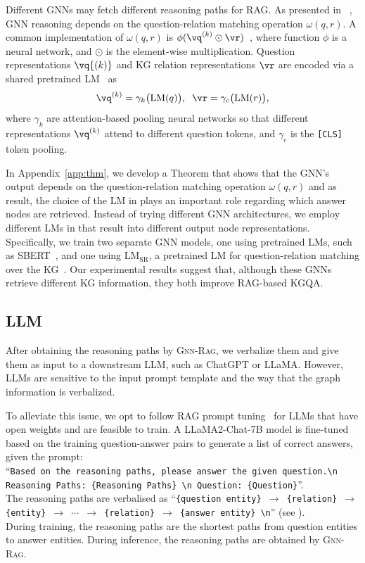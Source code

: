 \documentclass{article}
\newcommand{\grag}{\textsc{Gnn-Rag}\xspace}
\newcommand{\lmsr}{$\text{LM}_{\text{SR}}$\xspace}
\theoremstyle{plain}
\theoremstyle{definition}
\theoremstyle{remark}
\begin{document}
Different GNNs may fetch different reasoning paths for RAG. As presented in ~, GNN reasoning depends on the question-relation matching operation $\omega(q,r)$. A common implementation of $\omega(q,r)$ is  $\phi(\vq^{(k)} \odot \vr)$~\citep{he2021improving},  where function $\phi$ is a  neural network, and $\odot$ is the element-wise multiplication.  Question representations $\vq{(k)}$ and KG relation representations $\vr$ are encoded via a shared pretrained LM~\citep{jiang2023unikgqa} as
\begin{equation}
    \vq^{(k)} = \gamma_k\big( \text{LM}(q)\big),  \; \; \vr = \gamma_c \big( \text{LM}(r) \big),
    \label{eq:inst}
\end{equation}
where $\gamma_k$ are attention-based pooling neural networks so that different representations $\vq^{(k)}$ attend to different question tokens, and $\gamma_\text{c}$ is the \texttt{[CLS]} token pooling. 

In Appendix~\ref{app:thm}, we develop a Theorem  that shows that the GNN's output depends on the question-relation matching operation $\omega(q,r)$ and as result, the choice of the LM in  plays an important role regarding which answer nodes are retrieved. 
Instead of trying different GNN architectures, we employ different LMs in  that result into different output node representations. Specifically, we train two separate GNN models, one using pretrained LMs, such as  SBERT~\citep{reimers2019sentence}, and one using \lmsr, a pretrained LM for question-relation matching over the KG~\citep{zhang2022subgraph}. Our experimental results suggest that, although these GNNs retrieve different KG information, they both improve RAG-based KGQA.

\subsection{LLM} \label{sec:llm}

After obtaining the reasoning paths by \grag, we verbalize them and give them as input to a downstream LLM, such as ChatGPT or LLaMA. However, LLMs are sensitive to the input prompt template and the way that the graph information is verbalized.  

To alleviate this issue, we opt to follow RAG prompt tuning~\citep{lin2023radit,zhang2024raft} for LLMs that have open weights and are feasible to train. A LLaMA2-Chat-7B model is fine-tuned based on the training question-answer pairs to generate a list of correct answers, given the prompt: \\
``\texttt{Based on the reasoning paths, please answer the given question.\textbackslash n Reasoning Paths: \{Reasoning Paths\} \textbackslash n Question: \{Question\}}''. \\
The reasoning paths are verbalised as  ``\texttt{\{question entity\} $\rightarrow$ \{relation\} $\rightarrow$ \{entity\} $\rightarrow$ $\cdots$ $\rightarrow$ \{relation\} $\rightarrow$ \{answer entity\} \textbackslash n}'' (see ). \\
During training, the reasoning paths are the shortest paths from question entities to answer entities. During inference, the reasoning paths are obtained by \grag. 
\end{document}
